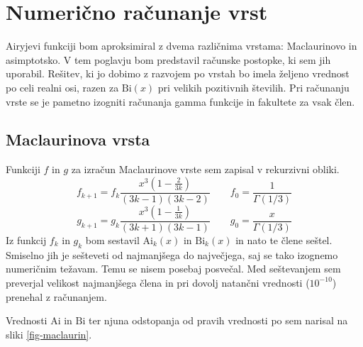 \documentclass[a4paper, 12pt, slovene]{article}
\newcommand{\Ai}{\mathrm{Ai}}
\newcommand{\Bi}{\mathrm{Bi}}
\begin{document}
\section{Numerično računanje vrst}
Airyjevi funkciji bom aproksimiral z dvema različnima vrstama: Maclaurinovo in asimptotsko. V tem poglavju bom predstavil računske postopke, ki sem jih uporabil. Rešitev, ki jo dobimo z razvojem po vrstah bo imela željeno vrednost po celi realni osi, razen za $\Bi(x)$ pri velikih pozitivnih številih. Pri računanju vrste se je pametno izogniti računanja gamma funkcije in fakultete za vsak člen.

\subsection{Maclaurinova vrsta}
Funkciji $f$ in $g$ za izračun Maclaurinove vrste sem zapisal v rekurzivni obliki.
\begin{equation}
f_{k+1} = f_k \frac{x^3(1-\frac{2}{3k})}{(3k-1)(3k-2)} \qquad f_0 = \frac{1}{\Gamma(1/3)}
\end{equation}
\begin{equation}
g_{k+1} = g_k \frac{x^3(1-\frac{1}{3k})}{(3k+1)(3k-1)} \qquad g_0 = \frac{x}{\Gamma(1/3)}
\end{equation}
Iz funkcij $f_k$ in $g_k$ bom sestavil $\Ai_k(x)$ in $\Bi_k(x)$ in nato te člene seštel. Smiselno jih je sešteveti od najmanjšega do največjega, saj se tako izognemo numeričnim težavam. Temu se nisem posebaj posvečal. Med seštevanjem sem preverjal velikost najmanjšega člena in pri dovolj natančni vrednosti ($10^{-10}$) prenehal z računanjem. \par\vspace{5mm}

Vrednosti $\Ai$ in $\Bi$ ter njuna odstopanja od pravih vrednosti po sem narisal na sliki \ref{fig-maclaurin}.
\end{document}
